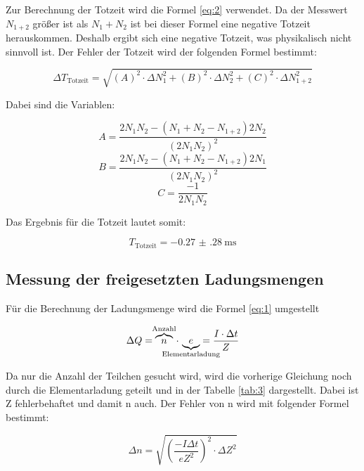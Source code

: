 Zur Berechnung der Totzeit wird die Formel \ref{eq:2} verwendet.
Da der Messwert $N_{1+2}$ größer ist als $N_1 + N_2$ ist bei dieser Formel eine
negative Totzeit herauskommen. Deshalb ergibt sich eine negative Totzeit, was
physikalisch nicht sinnvoll ist.
Der Fehler der Totzeit wird der folgenden Formel bestimmt:

\begin{equation*}
  \Delta T_\text{Totzeit} = \sqrt{\left( A \right)^2 \cdot \Delta N_1^2 +
  \left( B \right)^2 \cdot \Delta N_2^2 +
  \left( C \right)^2 \cdot \Delta N_{1+2}^2}
\end{equation*}

Dabei sind die Variablen:

\begin{equation*}
  A = \frac{2N_1N_2 - (N_1+N_2-N_{1+2})2N_2}{(2N_1N_2)^2}
\end{equation*}
\begin{equation*}
  B = \frac{2N_1N_2 - (N_1+N_2-N_{1+2})2N_1}{(2N_1N_2)^2}
\end{equation*}
\begin{equation*}
  C = \frac{-1}{2N_1N_2}
\end{equation*}

Das Ergebnis  für die Totzeit lautet somit:

\begin{equation*}
  T_{\text{Totzeit}} = \SI{-0.27(28)}{\milli\second}
\end{equation*}


\subsection{Messung der freigesetzten Ladungsmengen}

Für die Berechnung der Ladungsmenge wird die Formel \ref{eq:1} umgestellt

\begin{equation*}
  \Delta Q =\overbrace{n}^{\mathclap{\text{Anzahl}}} \, \cdot \, \underbrace{e}_{\mathclap{\text{Elementarladung}}}  =  \frac{I \cdot \Delta t}{Z}
\end{equation*}

Da nur die Anzahl der Teilchen gesucht wird, wird die vorherige Gleichung noch durch die Elementarladung geteilt und in der Tabelle \ref{tab:3}
dargestellt. Dabei ist Z fehlerbehaftet und damit n auch. Der Fehler von n wird mit folgender Formel bestimmt:

\begin{equation*}
  \Delta n = \sqrt{\left( \frac{-I \Delta t}{e Z^2} \right)^2 \cdot \Delta Z^2}
\end{equation*}

